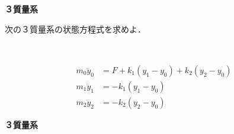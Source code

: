 \documentclass[a4paper,11pt]{jreport}
\begin{document}
\noindent
{\bf ３質量系}

次の３質量系の状態方程式を求めよ．
\begin{figure}[htbp]
 \begin{center}
 \end{center}
\end{figure}
\begin{align}
	m_0 \ddot{y}_0 & = F + k_1 (y_1 - y_0) + k_2 (y_2-y_0)
\nonumber \\
	m_1 \ddot{y}_1 & = - k_1 (y_1 - y_0)
\nonumber \\
	m_2 \ddot{y}_2 & = - k_2 (y_2 - y_0)
\nonumber
\end{align}

\newpage

\noindent
{\bf ３質量系}
\end{document}
